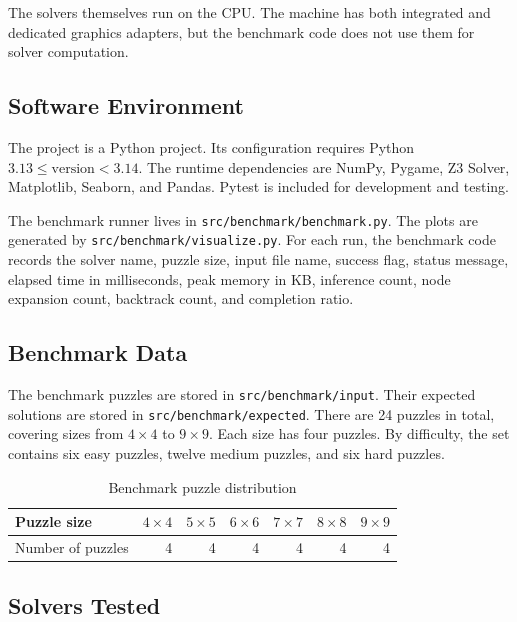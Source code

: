 The solvers themselves run on the CPU. The machine has both integrated and
dedicated graphics adapters, but the benchmark code does not use them for
solver computation.

\subsection{Software Environment}

The project is a Python project. Its configuration requires
Python \(3.13 \leq \text{version} < 3.14\). The runtime dependencies are NumPy,
Pygame, Z3 Solver, Matplotlib, Seaborn, and Pandas. Pytest is included for
development and testing.

The benchmark runner lives in \texttt{src/benchmark/benchmark.py}. The plots are
generated by \texttt{src/benchmark/visualize.py}. For each run, the benchmark
code records the solver name, puzzle size, input file name, success flag, status
message, elapsed time in milliseconds, peak memory in KB, inference count, node
expansion count, backtrack count, and completion ratio.

\subsection{Benchmark Data}

The benchmark puzzles are stored in \texttt{src/benchmark/input}. Their expected
solutions are stored in \texttt{src/benchmark/expected}. There are 24 puzzles in
total, covering sizes from \(4 \times 4\) to \(9 \times 9\). Each size has four
puzzles. By difficulty, the set contains six easy puzzles, twelve medium
puzzles, and six hard puzzles.

\begin{table}[htbp]
  \centering
  \caption{Benchmark puzzle distribution}
  \label{tab:benchmark_puzzle_distribution}
  \begin{tabular}{lrrrrrr}
    \toprule
    Puzzle size & \(4\times4\) & \(5\times5\) & \(6\times6\) & \(7\times7\) & \(8\times8\) & \(9\times9\) \\
    \midrule
    Number of puzzles & 4 & 4 & 4 & 4 & 4 & 4 \\
    \bottomrule
  \end{tabular}
\end{table}

\subsection{Solvers Tested}

